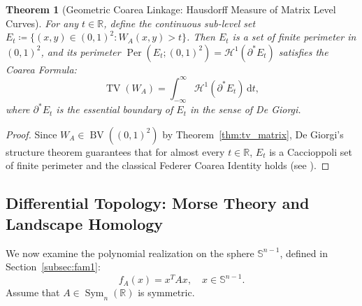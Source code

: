 \documentclass[11pt,a4paper,reqno]{amsart}
\newtheorem{theorem}{Theorem}[section]
\theoremstyle{definition}
\numberwithin{equation}{section}
\newcommand{\R}{\mathbb{R}}
\newcommand{\Sph}{\mathbb{S}}
\newcommand{\BV}{\operatorname{BV}}
\newcommand{\TV}{\operatorname{TV}}
\newcommand{\Per}{\operatorname{Per}}
\newcommand{\dif}{\,\mathrm{d}}
\begin{document}
\begin{theorem}[Geometric Coarea Linkage: Hausdorff Measure of Matrix Level Curves]
\label{thm:coarea_linkage}
For any $t \in \R$, define the continuous sub-level set $E_t \coloneqq \{(x, y) \in (0, 1)^2 \colon W_A(x, y) > t\}$. Then $E_t$ is a set of finite perimeter in $(0, 1)^2$, and its perimeter $\Per(E_t; (0,1)^2) = \mathcal{H}^1(\partial^* E_t)$ satisfies the \emph{Coarea Formula}:
\begin{equation}
    \label{eq:coarea}
    \TV(W_A) = \int_{-\infty}^\infty \mathcal{H}^1(\partial^* E_t) \dif t,
\end{equation}
where $\partial^* E_t$ is the essential boundary of $E_t$ in the sense of De Giorgi.
\end{theorem}
\begin{proof}
Since $W_A \in \BV((0,1)^2)$ by Theorem~\ref{thm:tv_matrix}, De Giorgi's structure theorem guarantees that for almost every $t \in \R$, $E_t$ is a Caccioppoli set of finite perimeter and the classical Federer Coarea Identity holds (see \cite{evans2015measure}).
\end{proof}

\subsection{Differential Topology: Morse Theory and Landscape Homology}
\label{subsec:morse}

We now examine the polynomial realization on the sphere $\Sph^{n-1}$, defined in Section~\ref{subsec:fam1}:
\begin{equation}
    f_A(x) = x^T A x, \quad x \in \Sph^{n-1}.
\end{equation}
Assume that $A \in \operatorname{Sym}_n(\R)$ is symmetric.
\end{document}
